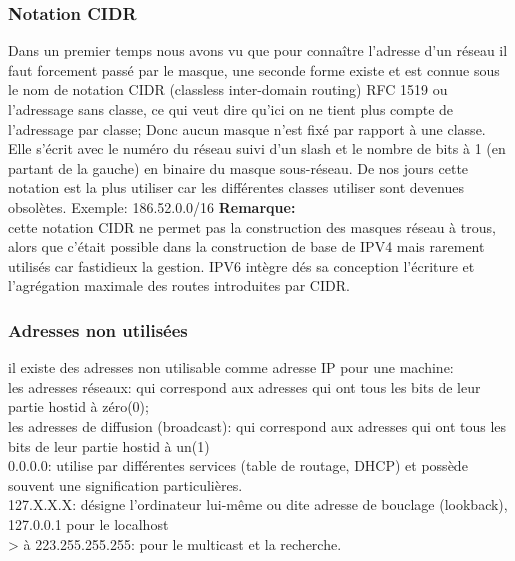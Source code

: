 \subsubsection{Notation CIDR}
Dans un premier temps nous avons vu que pour connaître l’adresse d’un
réseau il faut forcement passé par le masque, une seconde forme existe et est
connue sous le nom de notation CIDR (classless inter-domain routing) RFC 1519
ou l’adressage sans classe, ce qui veut dire qu’ici on ne tient plus compte de
l’adressage par classe; Donc aucun masque n’est fixé par rapport à une classe.
Elle s’écrit avec le numéro du réseau suivi d’un slash et le nombre de bits à 1
(en partant de la gauche) en binaire du masque sous-réseau. De nos jours cette
notation est la plus utiliser car les différentes classes utiliser sont
devenues  obsolètes.
\vspace{1cm}
Exemple: 186.52.0.0/16
\vspace{1cm}
\textbf{Remarque:}\\
cette notation CIDR ne permet pas la construction des masques réseau à trous,
alors que c’était possible dans la construction de base de IPV4 mais rarement
utilisés car fastidieux la gestion.  IPV6 intègre dés sa conception l’écriture
et l’agrégation maximale des routes introduites par CIDR. 


\subsubsection{Adresses non utilisées}
il existe des adresses non utilisable comme adresse IP pour une machine:\\
les adresses réseaux: qui correspond aux adresses qui ont tous les bits de
leur partie hostid à zéro(0);\\
les adresses de diffusion (broadcast): qui correspond aux adresses qui ont
tous les bits de leur partie hostid à un(1)\\
0.0.0.0: utilise par différentes services (table de routage, DHCP) et possède
souvent une signification particulières. \\
127.X.X.X: désigne l’ordinateur lui-même ou dite adresse de bouclage
(lookback), 127.0.0.1 pour le localhost\\
> à 223.255.255.255: pour le multicast et la recherche.\\


